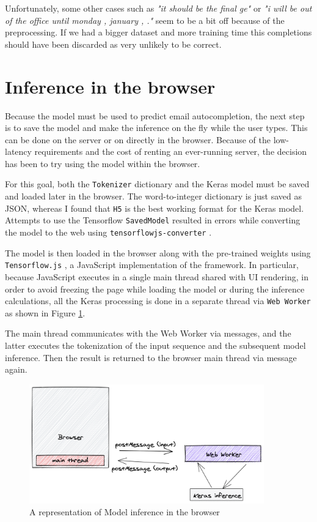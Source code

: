 \documentclass{article}
\begin{document}
Unfortunately, some other cases such as \textit{"it should be the final ge"} or \textit{"i will be out of the office until monday , january , ."} seem to be a bit off because of the preprocessing. If we had a bigger dataset and more training time this completions should have been discarded as very unlikely to be correct.

\section{Inference in the browser}\label{inference-in-the-browser}

Because the model must be used to predict email autocompletion, the next step is to save the model and make the inference on the fly while the user types. This can be done on the server or on directly in the browser. Because of the low-latency requirements and the cost of renting an ever-running server, the decision has been to try using the model within the browser.

For this goal, both the \texttt{Tokenizer} dictionary and the Keras model must be saved and loaded later in the browser. The word-to-integer dictionary is just saved as JSON, whereas I found that \texttt{H5} is the best working format for the Keras model. Attempts to use the Tensorflow \texttt{SavedModel} \cite{saved-model} resulted in errors while converting the model to the web using \texttt{tensorflowjs-converter} \cite{model-conversion}.

The model is then loaded in the browser along with the pre-trained weights using \texttt{Tensorflow.js} \cite{tensorflowjs}, a JavaScript implementation of the framework. In particular, because JavaScript executes in a single main thread shared with UI rendering, in order to avoid freezing the page while loading the model or during the inference calculations, all the Keras processing is done in a separate thread via \texttt{Web Worker} \cite{web-worker} as shown in Figure \ref{keras-web-worker}.

The main thread communicates with the Web Worker via messages, and the latter executes the tokenization of the input sequence and the subsequent model inference. Then the result is returned to the browser main thread via message again.

\begin{figure}[htbp]
\centering
\includegraphics[width=4in]{images/keras-web-worker.png}
\caption{A representation of Model inference in the browser}
\label{keras-web-worker}
\end{figure}
\end{document}
